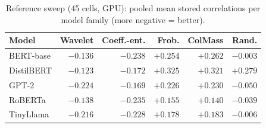 \documentclass[conference]{IEEEtran}
\begin{document}
\begin{table}[t]
\centering
\caption{Reference sweep (45 cells, GPU): pooled mean stored
correlations per model family (more negative = better).}
\label{tab:gpusweep}
\setlength{\tabcolsep}{3.4pt}
\begin{tabular}{lrrrrr}
\toprule
Model & Wavelet & Coeff.-ent. & Frob. & ColMass & Rand. \\
\midrule
BERT-base   & $-0.136$ & $-0.238$ & $+0.254$ & $+0.262$ & $-0.003$ \\
DistilBERT  & $-0.123$ & $-0.172$ & $+0.325$ & $+0.321$ & $+0.279$ \\
GPT-2       & $-0.224$ & $-0.169$ & $+0.226$ & $+0.230$ & $-0.050$ \\
RoBERTa     & $-0.138$ & $-0.235$ & $+0.155$ & $+0.140$ & $-0.039$ \\
TinyLlama   & $-0.216$ & $-0.228$ & $+0.178$ & $+0.183$ & $-0.006$ \\
\bottomrule
\end{tabular}
\end{table}
\end{document}
